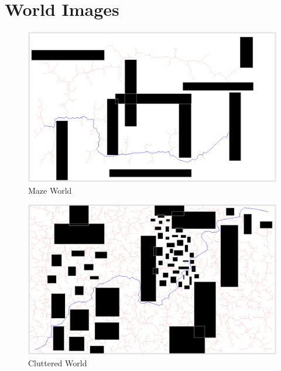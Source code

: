 \documentclass[10pt,twoside,twocolumn]{article}
\begin{document}
{}


\appendix 
\section{World Images}
\begin{figure}[h]
\begin{center}
\includegraphics[scale=0.20]{paper_world.png}
\end{center}
\caption{Maze World}
\end{figure}
\begin{figure}[h]
\begin{center}
\includegraphics[scale=0.2]{cluttered_world.png}
\end{center}
\caption{Cluttered World}
\end{figure}
\end{document}
